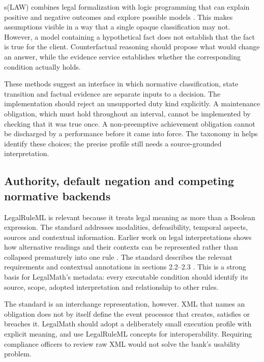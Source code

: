 \documentclass[12pt,a4paper,oneside,openany]{book}
\begin{document}
s(LAW) combines legal formalization with logic programming that can explain
positive and negative outcomes and explore possible models
\citep[secs.~2--5]{slaw2024}. This makes assumptions visible in a way that a
single opaque classification may not. However, a model containing a hypothetical
fact does not establish that the fact is true for the client. Counterfactual
reasoning should propose what would change an answer, while the evidence
service establishes whether the corresponding condition actually holds.

These methods suggest an interface in which normative classification,
state transition and factual evidence are separate inputs to a decision. The
implementation should reject an unsupported duty kind explicitly. A maintenance
obligation, which must hold throughout an interval, cannot be implemented by
checking that it was true once. A non-preemptive achievement obligation cannot
be discharged by a performance before it came into force. The taxonomy in
\citet[sec.~3]{normative2016} helps identify these choices; the precise profile
still needs a source-grounded interpretation.

\subsection{Authority, default negation and competing normative backends}
\label{merge:P-02-literature:04}


LegalRuleML is relevant because it treats legal meaning as more than a Boolean
expression. The standard addresses modalities, defeasibility, temporal aspects,
sources and contextual information. Earlier work on legal interpretations shows
how alternative readings and their contexts can be represented rather than
collapsed prematurely into one rule
\citep[sec.~4]{legalinterpretations2014}. The standard describes the relevant
requirements and contextual annotations in sections 2.2--2.3
\citep{legalruleml2021}. This is a strong basis
for LegalMath's metadata: every executable condition should identify its source,
scope, adopted interpretation and relationship to other rules.

The standard is an interchange representation, however. XML that names an
obligation does not by itself define the event processor that creates, satisfies
or breaches it. LegalMath should adopt a deliberately small execution profile
with explicit meaning, and use LegalRuleML concepts for interoperability. Requiring
compliance officers to review raw XML would not solve the bank's usability problem.
\end{document}
